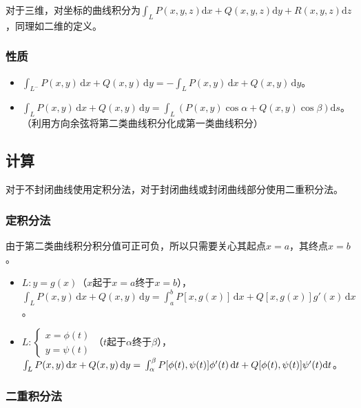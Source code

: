 对于三维，对坐标的曲线积分为$\int_LP(x,y,z)\textrm{d}x+Q(x,y,z)\textrm{d}y+R(x,y,z)\textrm{d}z$，同理如二维的定义。

\subsubsection{性质}

\begin{itemize}
    \item $\int_{L^-}P(x,y)\,\textrm{d}x+Q(x,y)\,\textrm{d}y=-\int_LP(x,y)\,\textrm{d}x+Q(x,y)\,\textrm{d}y$。
    \item $\int_LP(x,y)\,\textrm{d}x+Q(x,y)\,\textrm{d}y=\int_L(P(x,y)\cos\alpha+Q(x,y)\cos\beta)\textrm{d}s$。（利用方向余弦将第二类曲线积分化成第一类曲线积分）
\end{itemize}

\subsection{计算}

对于不封闭曲线使用定积分法，对于封闭曲线或封闭曲线部分使用二重积分法。

\subsubsection{定积分法}

由于第二类曲线积分积分值可正可负，所以只需要关心其起点$x=a$，其终点$x=b$。

\begin{itemize}
    \item $L:y=g(x)$（$x$起于$x=a$终于$x=b$），$\int_LP(x,y)\,\textrm{d}x+Q(x,y)\,\textrm{d}y=\int_a^bP[x,g(x)]\,\textrm{d}x+Q[x,g(x)]g'(x)\,\textrm{d}x$。
    \item $L:\left\{\begin{array}{c}
        x=\phi(t) \\
        y=\psi(t)
    \end{array}\right.$（$t$起于$\alpha$终于$\beta$），$\int_LP(x,y)\,\textrm{d}x+Q(x,y)\,\textrm{d}y=\\\int_\alpha^\beta P[\phi(t),\psi(t)]\phi'(t)\,\textrm{d}t+Q[\phi(t),\psi(t)]\psi'(t)\textrm{d}t$。 
\end{itemize}

\subsubsection{二重积分法}

